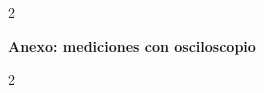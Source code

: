 \documentclass[a4paper]{article}
\begin{document}
    
    
    
    \saltoPag{}
    \begin{multicols}{2} 
        
        
        
        
    \end{multicols}

    \clearpage
    \thispagestyle{empty}
    \null
    \vfill
    \begin{center}
        \Huge \textbf{Anexo: mediciones con osciloscopio}
    \end{center}
    \vfill
    \clearpage

    \begin{multicols}{2}
        
    \end{multicols}
\end{document}
